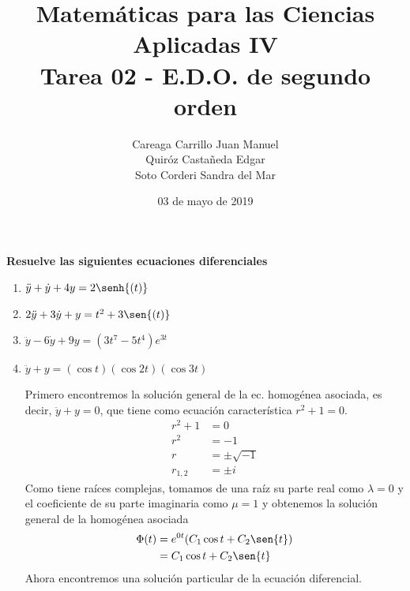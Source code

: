 \documentclass{article}
\title{
    Matemáticas para las Ciencias Aplicadas IV\\
    Tarea 02 - E.D.O. de segundo orden
}
\author{
    Careaga Carrillo Juan Manuel \\
    Quiróz Castañeda Edgar \\
    Soto Corderi Sandra del Mar
}
\date{
    03 de mayo de 2019
}
\begin{document}
    \maketitle
    {\bf Resuelve las siguientes ecuaciones diferenciales}
    \begin{enumerate}
        \item {
            $\ddot y+\dot y+4y=2\senh{(t)}$

            \color{azul}
        }
        \item {
            $2\ddot y+3\dot y+y=t^2+3\sen{(t)}$

            \color{azul}
        }
        \item {
            $\ddot y-6\dot y+9y=\left(3t^7-5t^4\right)e^{3t}$

            \color{azul}
        }
        \item {
            $\ddot y+y=(\cos{t})(\cos{2t})(\cos{3t})$

            \color{azul}
            Primero encontremos la solución general de la ec. homogénea asociada, es decir,
            $\ddot y+y=0$, que tiene como ecuación característica $r^2+1=0$.
            \begin{align*}
                r^2+1 &= 0 \\
                r^2 &= -1 \\
                r &= \pm\sqrt{-1} \\
                r_{1,2} &= \pm i
            \end{align*}
            Como tiene raíces complejas, tomamos de una raíz su parte real como $\lambda=0$ y el
            coeficiente de su parte imaginaria como $\mu=1$ y obtenemos la solución general de 
            la homogénea asociada
            \begin{align*}
                \Phi(t) &= e^{0t}(C_1\cos{t}+C_2\sen{t}) \\
                        &= C_1\cos{t}+C_2\sen{t}
            \end{align*}
            Ahora encontremos una solución particular de la ecuación diferencial.

}
\end{enumerate}
\end{document}
